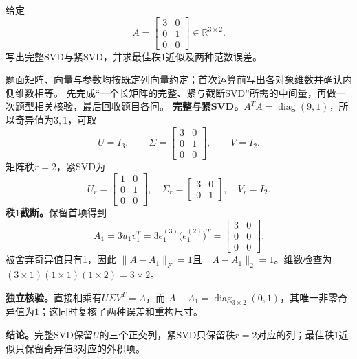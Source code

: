\label{struct:V4-C03-CH18}
\label{struct:V4-C03-CH32}
\begin{example}\label{exm:V4-C03-tall}
给定
\[
A=\begin{bmatrix}
3&0\\
0&1\\
0&0
\end{bmatrix}\in\mathbb R^{3\times2}.
\]
写出完整SVD与紧SVD，并求最佳秩1近似及两种范数误差。

\label{struct:V4-C03-CH33}
\end{example}
\begin{solution}
\SolGiven 题面矩阵、向量与参数均按既定列向量约定；首次运算前写出各对象维数并确认内侧维数相等。
\SolPlan 先完成“一个长矩阵的完整、紧与截断SVD”所需的中间量，再做一次题型相关核验，最后回收题目各问。
\SolDerive
\textbf{完整与紧SVD。}$A^TA=\operatorname{diag}(9,1)$，所以奇异值为$3,1$，可取
\[
U=I_3,\qquad
\Sigma=\begin{bmatrix}3&0\\0&1\\0&0\end{bmatrix},\qquad
V=I_2.
\]
矩阵秩$r=2$，紧SVD为
\[
U_r=\begin{bmatrix}1&0\\0&1\\0&0\end{bmatrix},\quad
\Sigma_r=\begin{bmatrix}3&0\\0&1\end{bmatrix},\quad
V_r=I_2.
\]
\textbf{秩$1$截断。}保留首项得到
\[
A_1=3u_1v_1^T
=3e_1^{(3)}\bigl(e_1^{(2)}\bigr)^T=
\begin{bmatrix}3&0\\0&0\\0&0\end{bmatrix}.
\]
被舍弃奇异值只有1，因此
$\|A-A_1\|_F=1$且$\|A-A_1\|_2=1$。维数检查为
$(3\times1)(1\times1)(1\times2)=3\times2$。

\textbf{独立核验。}直接相乘有$U\Sigma V^T=A$，而
$A-A_1=\operatorname{diag}_{3\times2}(0,1)$，其唯一非零奇异值为$1$；这同时复核了两种误差和重构尺寸。

\textbf{结论。}完整SVD保留$U$的三个正交列，紧SVD只保留秩$r=2$对应的列；最佳秩$1$近似只保留奇异值$3$对应的外积项。
\end{solution}

